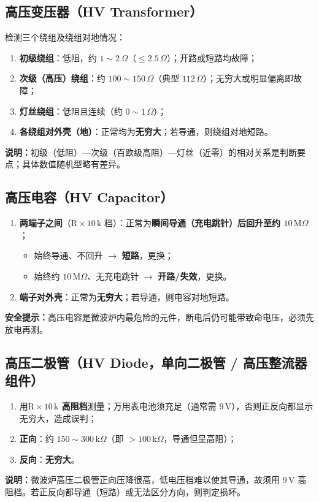 \documentclass[12pt,a4paper]{ctexbook}
\begin{document}
\subsection{高压变压器（HV Transformer）}
检测三个绕组及绕组对地情况：
\begin{enumerate}
  \item \textbf{初级绕组}：低阻，约 $1\sim2\,\Omega$（$\le 2.5\,\Omega$）；开路或短路均故障；
  \item \textbf{次级（高压）绕组}：约 $100\sim150\,\Omega$（典型 $112\,\Omega$）；无穷大或明显偏离即故障；
  \item \textbf{灯丝绕组}：低阻且连续（约 $0\sim1\,\Omega$）；
  \item \textbf{各绕组对外壳（地）}：正常均为\textbf{无穷大}；若导通，则绕组对地短路。
\end{enumerate}
\textbf{说明：}初级（低阻）—次级（百欧级高阻）—灯丝（近零）的相对关系是判断要点；具体数值随机型略有差异。

\subsection{高压电容（HV Capacitor）}
\begin{enumerate}
  \item \textbf{两端子之间}（$\mathrm{R}\times10\,\mathrm{k}$ 档）：正常为\textbf{瞬间导通（充电跳针）后回升至约 $10\,\mathrm{M}\Omega$}；
    \begin{itemize}
      \item 始终导通、不回升 $\rightarrow$ \textbf{短路}，更换；
      \item 始终约 $10\,\mathrm{M}\Omega$、无充电跳针 $\rightarrow$ \textbf{开路/失效}，更换。
    \end{itemize}
  \item \textbf{端子对外壳}：正常为\textbf{无穷大}；若导通，则电容对地短路。
\end{enumerate}
\textbf{安全提示：}高压电容是微波炉内最危险的元件，断电后仍可能带致命电压，必须先放电再测。

\subsection{高压二极管（HV Diode，单向二极管 / 高压整流器组件）}
\begin{enumerate}
  \item 用\textbf{$\mathrm{R}\times10\,\mathrm{k}$ 高阻档}测量；万用表电池须充足（通常需 $9\,\mathrm{V}$），否则正反向都显示无穷大，造成误判；
  \item \textbf{正向}：约 $150\sim300\,\mathrm{k}\Omega$（即 $>100\,\mathrm{k}\Omega$，导通但呈高阻）；
  \item \textbf{反向}：\textbf{无穷大}。
\end{enumerate}
\textbf{说明：}微波炉高压二极管正向压降很高，低电压档难以使其导通，故须用 $9\,\mathrm{V}$ 高阻档。若正反向都导通（短路）或无法区分方向，则判定损坏。
\end{document}
